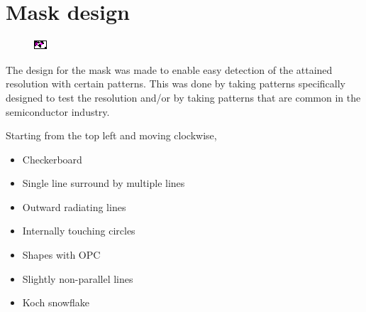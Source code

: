 \section{Mask design}
\begin{figure}[H]
    \centering
    \includegraphics[trim=0mm 0.12mm 0.17mm 0mm, clip=true,width=\linewidth]{figures/litho_design.pdf}
    \label{fig:litho_design}
\end{figure}

The design for the mask was made to enable easy detection of the attained resolution with certain patterns. This was done by taking patterns specifically designed to test the resolution and/or by taking patterns that are common in the semiconductor industry.

Starting from the top left and moving clockwise,

\begin{itemize}
    \item Checkerboard
    \item Single line surround by multiple lines
    \item Outward radiating lines
    \item Internally touching circles
    \item Shapes with OPC
    \item Slightly non-parallel lines
    \item Koch snowflake
\end{itemize}

